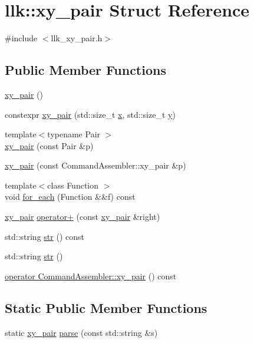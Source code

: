 \hypertarget{structllk_1_1xy__pair}{}\section{llk\+:\+:xy\+\_\+pair Struct Reference}
\label{structllk_1_1xy__pair}


{\ttfamily \#include $<$llk\+\_\+xy\+\_\+pair.\+h$>$}

\subsection*{Public Member Functions}
\begin{DoxyCompactItemize}
\item 
\hyperlink{structllk_1_1xy__pair_ae83534da806de13692d9a1f513a61968}{xy\+\_\+pair} ()
\item 
constexpr \hyperlink{structllk_1_1xy__pair_aa8dc8fdc3fd5663ef038996ef30aa5b8}{xy\+\_\+pair} (std\+::size\+\_\+t \hyperlink{structllk_1_1xy__pair_a0529eda73df053ddcc7662187ca57e23}{x}, std\+::size\+\_\+t \hyperlink{structllk_1_1xy__pair_a95998ff2c605752606fea129d2adb409}{y})
\item 
{\footnotesize template$<$typename Pair $>$ }\\\hyperlink{structllk_1_1xy__pair_ac5524e1982092fb9355deb5a5f440192}{xy\+\_\+pair} (const Pair \&p)
\item 
\hyperlink{structllk_1_1xy__pair_aec16ff0f0fbd56708059f48769c4af8c}{xy\+\_\+pair} (const Command\+Assembler\+::xy\+\_\+pair \&p)
\item 
{\footnotesize template$<$class Function $>$ }\\void \hyperlink{structllk_1_1xy__pair_aee809f43444011ef5a89878e6c32b9bb}{for\+\_\+each} (Function \&\&f) const
\item 
\hyperlink{structllk_1_1xy__pair}{xy\+\_\+pair} \hyperlink{structllk_1_1xy__pair_a43aa7e67327dbb79cd6d040ea77c0d04}{operator+} (const \hyperlink{structllk_1_1xy__pair}{xy\+\_\+pair} \&right)
\item 
std\+::string \hyperlink{structllk_1_1xy__pair_ad3c688d70663331110ac68bdce324c48}{str} () const
\item 
std\+::string \hyperlink{structllk_1_1xy__pair_a4fa9ce275bc72c1b98ffdf9e7b7e7797}{str} ()
\item 
\hyperlink{structllk_1_1xy__pair_afdde5bcb5672613be31f7cad5d798857}{operator Command\+Assembler\+::xy\+\_\+pair} () const
\end{DoxyCompactItemize}
\subsection*{Static Public Member Functions}
\begin{DoxyCompactItemize}
\item 
static \hyperlink{structllk_1_1xy__pair}{xy\+\_\+pair} \hyperlink{structllk_1_1xy__pair_ac9e9ac443b0172af1da1157ecdc8665a}{parse} (const std\+::string \&s)
\end{DoxyCompactItemize}
